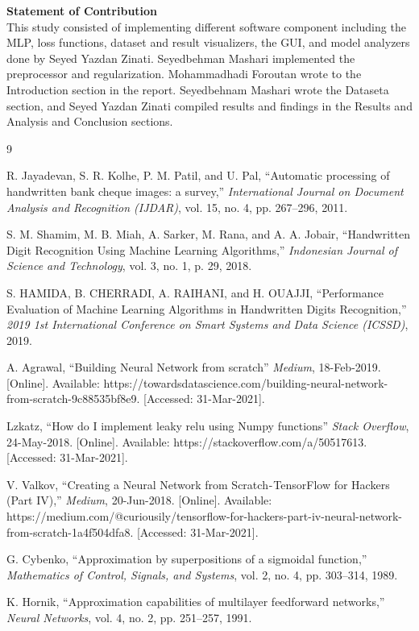 \documentclass[10pt]{article}
\begin{document}
\noindent \textbf{\large Statement of Contribution}\\
\footnotesize This study consisted of implementing different software component including the MLP, loss functions, dataset and result visualizers, the GUI, and model analyzers done by Seyed Yazdan Zinati. Seyedbehman Mashari implemented the preprocessor and regularization. Mohammadhadi Foroutan wrote to the Introduction section in the report. Seyedbehnam Mashari wrote the Dataseta section, and Seyed Yazdan Zinati compiled results and findings in the Results and Analysis and Conclusion sections.


\newpage
\begin{thebibliography}{9}

    \bibitem[1]{}
    R. Jayadevan, S. R. Kolhe, P. M. Patil, and U. Pal, “Automatic processing of handwritten bank cheque images: a survey,” \textit{International Journal on Document Analysis and Recognition (IJDAR)}, vol. 15, no. 4, pp. 267–296, 2011.

    \bibitem[2]{}
    S. M. Shamim, M. B. Miah, A. Sarker, M. Rana, and A. A. Jobair, “Handwritten Digit Recognition Using Machine Learning Algorithms,” \textit{Indonesian Journal of Science and Technology}, vol. 3, no. 1, p. 29, 2018.

    \bibitem[3]{}
    S. HAMIDA, B. CHERRADI, A. RAIHANI, and H. OUAJJI, “Performance Evaluation of Machine Learning Algorithms in Handwritten Digits Recognition,” \textit{2019 1st International Conference on Smart Systems and Data Science (ICSSD)}, 2019.

    \bibitem[4]{}
    A. Agrawal, “Building Neural Network from scratch” \textit{Medium}, 18-Feb-2019. [Online]. Available: https://towardsdatascience.com/building-neural-network-from-scratch-9c88535bf8e9. [Accessed: 31-Mar-2021].

    \bibitem[5]{}
    Lzkatz, “How do I implement leaky relu using Numpy functions” \textit{Stack Overflow}, 24-May-2018. [Online]. Available: https://stackoverflow.com/a/50517613. [Accessed: 31-Mar-2021].

    \bibitem[6]{}
    V. Valkov, “Creating a Neural Network from Scratch - TensorFlow for Hackers (Part IV),” \textit{Medium}, 20-Jun-2018. [Online]. Available: https://medium.com/@curiousily/tensorflow-for-hackers-part-iv-neural-network-from-scratch-1a4f504dfa8. [Accessed: 31-Mar-2021].

    \bibitem[7]{}
    G. Cybenko, “Approximation by superpositions of a sigmoidal function,” \textit{Mathematics of Control, Signals, and Systems}, vol. 2, no. 4, pp. 303–314, 1989.

    \bibitem[8]{}
    K. Hornik, “Approximation capabilities of multilayer feedforward networks,” \textit{Neural Networks}, vol. 4, no. 2, pp. 251–257, 1991.

\end{thebibliography}
\end{document}

